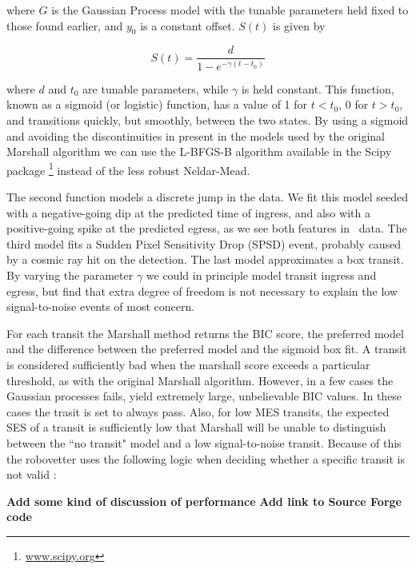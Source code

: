 \noindent
where $G$ is the Gaussian Process model with the tunable parameters held fixed to those found earlier, and $y_0$ is a constant offset. $S(t)$ is given by

\begin{equation}
S(t) = \frac{d}{1 - e^{-\gamma (t-t_0)} }
\end{equation}

\noindent
where $d$ and $t_0$ are tunable parameters, while $\gamma$ is held constant. This function, known as a sigmoid (or logistic) function, has a value of 1 for $t<t_0$, 0 for $t>t_0$, and transitions quickly, but smoothly, between the two states. By using a sigmoid and avoiding the discontinuities in present in the models used by the original Marshall algorithm we can use the L-BFGS-B algorithm \citep{Byrd95} available in the Scipy package \footnote{\url{www.scipy.org}} instead of the less robust Neldar-Mead.

The second function models a discrete jump in the data. We fit this model seeded with a negative-going dip at the predicted time of ingress, and also with a positive-going spike at the predicted egress, as we see both features in \Kepler\ data. The third model fits a Sudden Pixel Sensitivity Drop (SPSD) event, probably caused by a cosmic ray hit on the detection. The last model approximates a box transit. By varying the parameter $\gamma$ we could in principle model transit ingress and egress, but find that extra degree of freedom is not necessary to explain the low signal-to-noise events of most concern.

For each transit the Marshall method returns the BIC score, the preferred model and the difference between the preferred model and the sigmoid box fit.  A transit is considered sufficiently bad when the marshall score exceeds a particular threshold, as with the original Marshall algorithm.  However, in a few cases the Gaussian processes fails, yield extremely large, unbelievable BIC values. In these cases the trasit is set to always pass.  Also, for low MES transits, the expected SES of a transit is sufficiently low that Marshall will be unable to distinguish between the ``no transit" model and a low signal-to-noise transit.  Because of this the robovetter uses the following logic when deciding whether a specific transit is not valid :
\begin{equation}

\end{equation}

{\bf Add some kind of discussion of performance}
{\bf Add link to Source Forge code}
 
